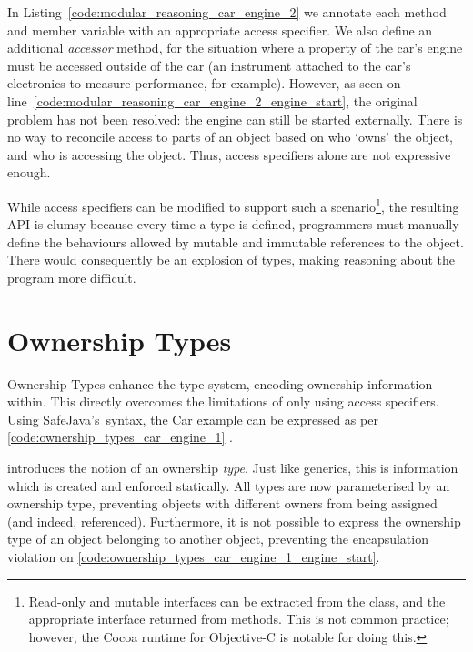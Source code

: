 \documentclass{acm_proc_article-sp}
\begin{document}
In Listing~\ref{code:modular_reasoning_car_engine_2} we annotate each method
and member variable with an appropriate access specifier. We also define an
additional \emph{accessor} method, for the situation where a property of the
car's engine must be accessed outside of the car (an instrument attached to the
car's electronics to measure performance, for example). However, as seen on
line~\ref{code:modular_reasoning_car_engine_2_engine_start}, the original
problem has not been resolved: the engine can still be started externally.
There is no way to reconcile access to parts of an object based on who `owns'
the object, and who is accessing the object. Thus, access specifiers alone are
not expressive enough.

While access specifiers can be modified to support such a
scenario\footnote{Read-only and mutable interfaces can be extracted from the
class, and the appropriate interface returned from methods. This is not common
practice; however, the Cocoa runtime for Objective-C is notable for doing
this.}, the resulting API is clumsy because every time a type is defined,
programmers must manually define the behaviours allowed by mutable and
immutable references to the object. There would consequently be an explosion of
types, making reasoning about the program more difficult.

\section{Ownership Types}
\label{sec:ownership}

Ownership Types enhance the type system, encoding ownership information within.
This directly overcomes the limitations of only using access specifiers. Using
SafeJava's\,\cite{boyapati04safejava} syntax, the Car example can be expressed
as per \cref{code:ownership_types_car_engine_1}
.

 introduces the notion of an ownership
\emph{type}. Just like generics, this is information which is created and
enforced statically. All types are now parameterised by an ownership type,
preventing objects with different owners from being assigned (and indeed,
referenced). Furthermore, it is not possible to express the ownership type of
an object belonging to another object, preventing the encapsulation violation
on \cref{code:ownership_types_car_engine_1_engine_start}.
\end{document}
